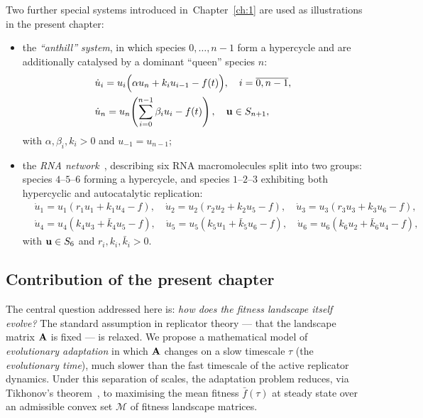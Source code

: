 \documentclass[12pt]{report}
\theoremstyle{definition}
\theoremstyle{remark}
\begin{document}
Two further special systems introduced in~Chapter~\ref{ch:1} are used as
illustrations in the present chapter:
\begin{itemize}
\item the \textit{``anthill'' system}, in which species $0, \ldots, n-1$ form a
hypercycle and are additionally catalysed by a dominant ``queen'' species $n$:
\begin{equation}
	\begin{aligned}
		&\dot{u}_i = u_i\Big(\alpha u_n + k_i u_{i-1} - f(t)\Big),
		\quad i = \overline{0, n-1}, \\
		&\dot{u}_n = u_n\!\left(\sum_{i=0}^{n-1}\beta_i u_i - f(t)\right), \quad
		{\bf u} \in S_{n+1},
	\end{aligned}
	\label{c3:eq1.21}
\end{equation}
with $\alpha, \beta_i, k_i > 0$ and $u_{-1} = u_{n-1}$;
\item the \textit{RNA network}~\cite{c3:Vaidya2012}, describing six RNA macromolecules
split into two groups: species $4$--$5$--$6$ forming a hypercycle, and species
$1$--$2$--$3$ exhibiting both hypercyclic and autocatalytic replication:
\begin{equation}
	\begin{aligned}
		&\dot{u}_1 = u_1(r_1 u_1 + k_1 u_4 - f), \quad
		 \dot{u}_2 = u_2(r_2 u_2 + k_2 u_5 - f), \quad
		 \dot{u}_3 = u_3(r_3 u_3 + k_3 u_6 - f), \\
		&\dot{u}_4 = u_4(k_4 u_3 + \bar{k}_4 u_5 - f), \quad
		 \dot{u}_5 = u_5(k_5 u_1 + \bar{k}_5 u_6 - f), \quad
		 \dot{u}_6 = u_6(k_6 u_2 + \bar{k}_6 u_4 - f),
	\end{aligned}
	\label{c3:eq1.25}
\end{equation}
with ${\bf u} \in S_6$ and $r_i, k_i, \bar{k}_i > 0$.
\end{itemize}

\subsection*{Contribution of the present chapter}

The central question addressed here is: \textit{how does the fitness landscape
itself evolve?} The standard assumption in replicator theory --- that the
landscape matrix ${\bf A}$ is fixed --- is relaxed. We propose a mathematical
model of \textit{evolutionary adaptation} in which ${\bf A}$ changes on a slow
timescale $\tau$ (the \textit{evolutionary time}), much slower than the fast
timescale of the active replicator dynamics. Under this separation of scales, the
adaptation problem reduces, via Tikhonov's theorem~\cite{c3:Tihonov1948}, to
maximising the mean fitness $\bar{f}(\tau)$ at steady state over an admissible
convex set $\mathcal{M}$ of fitness landscape matrices.
\end{document}
